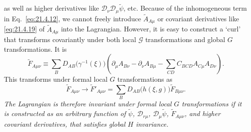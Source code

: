 as well as higher derivatives like $\mathcal D_\nu\mathcal D_\mu\widetilde\psi$, etc. Because of the inhomogeneous term in Eq.~\eqref{eq:21.4.12}, we cannot freely introduce $\widetilde A_{A\mu}$ or covariant derivatives like \eqref{eq:21.4.19} of $\widetilde A_{A\mu}$ into the Lagrangian. However, it is easy to construct a `curl' that transforms covariantly under both local $\mathcal G$ transformations and global $G$ transformations. It is
\begin{equation}
\widetilde F_{A\mu\nu}
\equiv
\sum_B D_{AB}\bigl(\gamma^{-1}(\xi)\bigr)
\left(
\partial_\mu A_{B\nu}-\partial_\nu A_{B\mu}
-\sum_{CD}C_{BCD}A_{C\mu}A_{D\nu}
\right).
\tag{21.4.20}\label{eq:21.4.20}
\end{equation}
This transforms under formal local $G$ transformations as
\begin{equation}
\widetilde F_{A\mu\nu}
\longrightarrow
\widetilde F'_{A\mu\nu}
=\sum_BD_{AB}\bigl(h(\xi,g)\bigr)\widetilde F_{B\mu\nu}.
\tag{21.4.21}\label{eq:21.4.21}
\end{equation}
\emph{The Lagrangian is therefore invariant under formal local $G$ transformations if it is constructed as an arbitrary function of $\widetilde\psi$, $\mathcal D_{r\mu}$, $\mathcal D_\mu\widetilde\psi$, $\widetilde F_{A\mu\nu}$, and higher covariant derivatives, that satisfies global $H$ invariance.}

